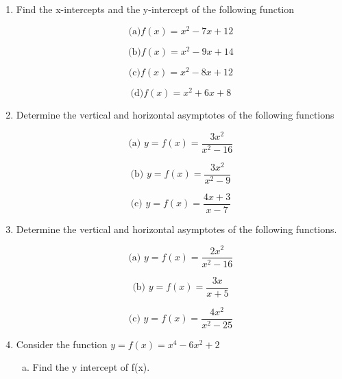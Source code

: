 \documentclass[a4paper,12pt]{article}
\begin{document}
\begin{enumerate}

	\item Find the x-intercepts and the y-intercept of the following function

\begin{multicols}{2}

\[\mbox{(a)} f(x) = x^2 - 7x + 12  \]	

\[\mbox{(b)}  f(x) = x^2 - 9x + 14  \]

\[\mbox{(c)}  f(x) = x^2 - 8x + 12 \]

\[\mbox{(d)}  f(x) = x^2 + 6x + 8  \]

\end{multicols}


	
	\item Determine the vertical and horizontal asymptotes of the following functions
	\vspace{-0.4cm}
	\begin{multicols}{3}
	\[\mbox{(a) } y = f(x) = \frac{3x^2}{x^2-16} \]	
	
	\[\mbox{(b) } y = f(x) = \frac{3x^2}{x^2-9} \]
    
    \[\mbox{(c) } y = f(x)  = \frac{4x+3}{x-7} \]


    \end{multicols}
	\item  Determine the vertical and horizontal asymptotes of the following functions.


		\vspace{-0.4cm}
	\begin{multicols}{3}
	\[\mbox{(a) } y = f(x) = \frac{2x^2}{x^2-16}\]	
	
	\[\mbox{(b) } y = f(x) = \frac{3x}{x+5}  \]
  	
    \[\mbox{(c) } y = f(x) = \frac{4x^2}{x^2-25} \]



    \end{multicols}
\item 
Consider the function $y = f(x) = x^4 - 6x^2 + 2$
\begin{enumerate}[(a)]
	\item Find the y intercept of f(x). 
	

\end{enumerate}
\end{enumerate}
\end{document}
